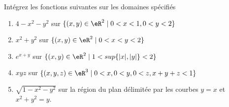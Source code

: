 
\begin{exercice}\label{exoIntMult0001}

Intégrez les fonctions suivantes sur les domaines spécifiés
\begin{enumerate}
\item $ 4 - x^2 - y^2$ sur  $\{(x,y)\in \eR^2 \mid 0<x<1, 0<y<2 \} $
\item $ x^2 + y^2$ sur $\{(x,y)\in \eR^2 \mid 0<x<y<2 \} $
\item $ e^{x+y}$ sur $\{(x,y)\in \eR^2 \mid 1 < sup\{|x|,|y|\} < 2 \} $
\item $ xyz$ sur $\{(x,y,z)\in \eR^3 \mid 0<x, 0<y, 0<z, x+y+z<1 \} $
\item $ \sqrt{1-x^2-y^2}$  sur la région du plan délimitée par les  courbes $y = x$ et $x^2+y^2=y$.
\end{enumerate}

\end{exercice}
